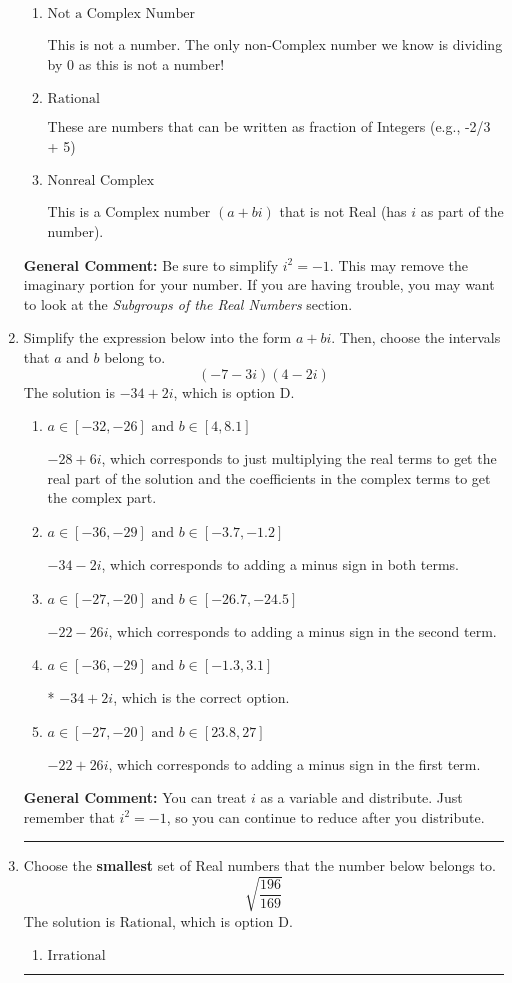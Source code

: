 \documentclass{extbook}[14pt]
\newcommand{\litem}[1]{\item #1

\rule{\textwidth}{0.4pt}}
\begin{document}
\begin{enumerate}
{\begin{enumerate}[label=\Alph*.]
These cannot be written as a fraction of Integers. Remember: $\pi$ is not an Integer!
\item \( \text{Not a Complex Number} \)

This is not a number. The only non-Complex number we know is dividing by 0 as this is not a number!
\item \( \text{Rational} \)

These are numbers that can be written as fraction of Integers (e.g., -2/3 + 5)
\item \( \text{Nonreal Complex} \)

This is a Complex number $(a+bi)$ that is not Real (has $i$ as part of the number).
\end{enumerate}

\textbf{General Comment:} Be sure to simplify $i^2 = -1$. This may remove the imaginary portion for your number. If you are having trouble, you may want to look at the \textit{Subgroups of the Real Numbers} section.
}
\litem{
Simplify the expression below into the form $a+bi$. Then, choose the intervals that $a$ and $b$ belong to.
\[ (-7 - 3 i)(4 - 2 i) \]The solution is \( -34 + 2 i \), which is option D.\begin{enumerate}[label=\Alph*.]
\item \( a \in [-32, -26] \text{ and } b \in [4, 8.1] \)

 $-28 + 6 i$, which corresponds to just multiplying the real terms to get the real part of the solution and the coefficients in the complex terms to get the complex part.
\item \( a \in [-36, -29] \text{ and } b \in [-3.7, -1.2] \)

 $-34 - 2 i$, which corresponds to adding a minus sign in both terms.
\item \( a \in [-27, -20] \text{ and } b \in [-26.7, -24.5] \)

 $-22 - 26 i$, which corresponds to adding a minus sign in the second term.
\item \( a \in [-36, -29] \text{ and } b \in [-1.3, 3.1] \)

* $-34 + 2 i$, which is the correct option.
\item \( a \in [-27, -20] \text{ and } b \in [23.8, 27] \)

 $-22 + 26 i$, which corresponds to adding a minus sign in the first term.
\end{enumerate}

\textbf{General Comment:} You can treat $i$ as a variable and distribute. Just remember that $i^2=-1$, so you can continue to reduce after you distribute.
}
\litem{
Choose the \textbf{smallest} set of Real numbers that the number below belongs to.
\[ \sqrt{\frac{196}{169}} \]The solution is \( \text{Rational} \), which is option D.\begin{enumerate}[label=\Alph*.]
\item \( \text{Irrational} \)


\end{enumerate}}
\end{enumerate}
\end{document}
